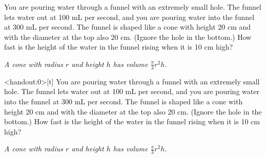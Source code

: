 \begin{frame}[t]
\MoreSpace\AnswerYes
You are pouring water through a funnel with an extremely small hole. The funnel lets water out at \textcolor{C3}{100 mL per second}, and you are pouring water into the funnel at \textcolor{C3}{300 mL per second}. The funnel is shaped like a cone with height \textcolor{C3}{ 20 cm} and with the diameter at the top also \textcolor{C3}{ 20 cm}. (Ignore the hole in the bottom.) How fast is the height of the water in the funnel rising when it is \textcolor{C3}{10 cm}  high?\vfill

\textit{A cone with radius $r$ and height $h$ has volume $\frac{\pi}{3}r^2h$.}
\end{frame}
\begin{frame}<handout:0>[t]\footnotesize
{}\AnswerYes
You are pouring water through a funnel with an extremely small hole. The funnel lets water out at \textcolor{C3}{100 mL per second}, and you are pouring water into the funnel at \textcolor{C3}{300 mL per second}. The funnel is shaped like a cone with height \textcolor{C3}{ 20 cm} and with the diameter at the top also \textcolor{C3}{ 20 cm}. (Ignore the hole in the bottom.) How fast is the height of the water in the funnel rising when it is \textcolor{C3}{10 cm}  high?

\textit{A cone with radius $r$ and height $h$ has volume $\frac{\pi}{3}r^2h$.}
\end{frame}
